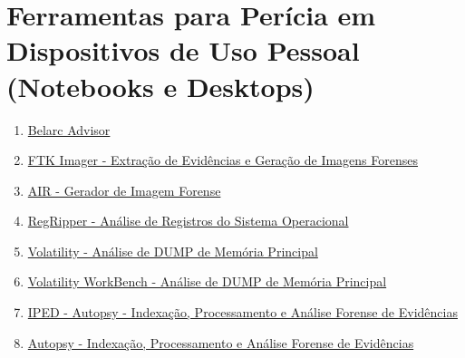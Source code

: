 \documentclass{article}
\begin{document}
\section{Ferramentas para Perícia em Dispositivos de Uso Pessoal (Notebooks e Desktops)}
\begin{enumerate}
\item \href{https://www.belarc.com/products/belarc-advisor}{Belarc Advisor}
\item \href{https://accessdata.com/product-download/ftk-imager-version-4-5}{FTK Imager - Extração de Evidências e Geração de Imagens Forenses}
\item \href{https://sourceforge.net/projects/air-imager/files/air-imager/air-2.0.0/}{AIR - Gerador de Imagem Forense}
\item \href{https://github.com/keydet89/RegRipper3.0}{RegRipper - Análise de Registros do Sistema Operacional}
\item \href{https://www.volatilityfoundation.org/releases}{Volatility - Análise de DUMP de Memória Principal}
\item \href{https://www.osforensics.com/tools/volatility-workbench.html}{Volatility WorkBench - Análise de DUMP de Memória Principal}
\item \href{https://github.com/sepinf-inc/IPED}{IPED - Autopsy - Indexação, Processamento e Análise Forense de Evidências}
\item \href{https://www.autopsy.com/download/}{Autopsy - Indexação, Processamento e Análise Forense de Evidências}
\end{enumerate}
\end{document}
